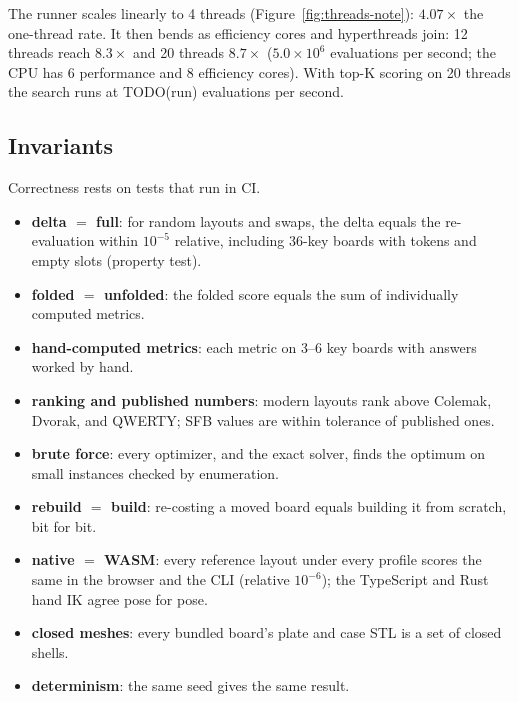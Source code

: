 \documentclass{gecko-paper}
\begin{document}
\begin{paperbody}

The runner scales linearly to 4 threads (Figure~\ref{fig:threads-note}): $4.07\times$ the one-thread rate. It then bends as efficiency cores and hyperthreads join: 12 threads reach $8.3\times$ and 20 threads $8.7\times$ ($5.0\times10^{6}$ evaluations per second; the CPU has 6 performance and 8 efficiency cores). With top-K scoring on 20 threads the search runs at TODO(run) evaluations per second.


\subsection{Invariants}
Correctness rests on tests that run in CI.
\begin{itemize}\setlength{\itemsep}{2pt}\setlength{\parskip}{0pt}
\item \textbf{delta $=$ full}: for random layouts and swaps, the delta equals the re-evaluation within $10^{-5}$ relative, including 36-key boards with tokens and empty slots (property test).
\item \textbf{folded $=$ unfolded}: the folded score equals the sum of individually computed metrics.
\item \textbf{hand-computed metrics}: each metric on 3–6 key boards with answers worked by hand.
\item \textbf{ranking and published numbers}: modern layouts rank above Colemak, Dvorak, and QWERTY; SFB values are within tolerance of published ones.
\item \textbf{brute force}: every optimizer, and the exact solver, finds the optimum on small instances checked by enumeration.
\item \textbf{rebuild $=$ build}: re-costing a moved board equals building it from scratch, bit for bit.
\item \textbf{native $=$ WASM}: every reference layout under every profile scores the same in the browser and the CLI (relative $10^{-6}$); the TypeScript and Rust hand IK agree pose for pose.
\item \textbf{closed meshes}: every bundled board's plate and case STL is a set of closed shells.
\item \textbf{determinism}: the same seed gives the same result.
\end{itemize}


\end{paperbody}
\end{document}
